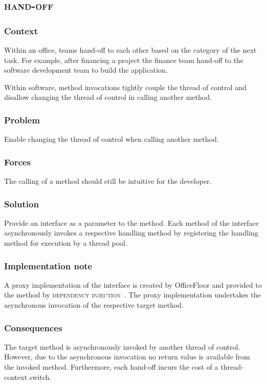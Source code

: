 \documentclass[prodmode]{style/acmlarge}
\begin{document}
\subsection{\textsc{\textbf{hand-off}}}

\subsubsection*{Context} Within an office, teams hand-off to each other based on
the category of the next task.  For example, after financing a project the
finance team hand-off to the software development team to build the application.

Within software, method invocations tightly couple the thread of control and
disallow changing the thread of control in calling another method.

\subsubsection*{\textbf{Problem}} Enable changing the thread of control when calling
another method.

\subsubsection*{Forces} The calling of a method should still be intuitive for
the developer.

\subsubsection*{\textbf{Solution}}  Provide an interface as a parameter to the
method.  Each method of the interface asynchronously invokes a respective
handling method by registering the handling method for execution by a thread
pool.

\subsubsection*{Implementation note} A proxy implementation of the interface is
created by OfficeFloor and provided to the method by \textsc{dependency
injection}~\cite{ioc}.  The proxy implementation undertakes the asynchronous
invocation of the respective target method.

\subsubsection*{Consequences} The target method is asynchronously invoked by
another thread of control.  However, due to the asynchronous invocation no
return value is available from the invoked method.  Furthermore, each hand-off
incurs the cost of a thread-context switch.
\end{document}
